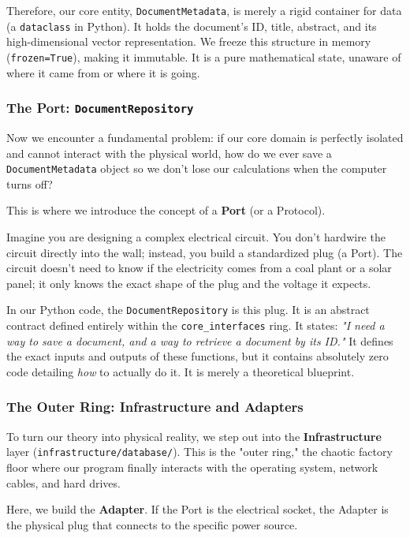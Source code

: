 Therefore, our core entity, \texttt{DocumentMetadata}, is merely a rigid container for data (a \texttt{dataclass} in Python). It holds the document's ID, title, abstract, and its high-dimensional vector representation. We freeze this structure in memory (\texttt{frozen=True}), making it immutable. It is a pure mathematical state, unaware of where it came from or where it is going.

\subsubsection*{The Port: \texttt{DocumentRepository}}

Now we encounter a fundamental problem: if our core domain is perfectly isolated and cannot interact with the physical world, how do we ever save a \texttt{DocumentMetadata} object so we don't lose our calculations when the computer turns off?

This is where we introduce the concept of a \textbf{Port} (or a Protocol).

Imagine you are designing a complex electrical circuit. You don't hardwire the circuit directly into the wall; instead, you build a standardized plug (a Port). The circuit doesn't need to know if the electricity comes from a coal plant or a solar panel; it only knows the exact shape of the plug and the voltage it expects.

In our Python code, the \texttt{DocumentRepository} is this plug. It is an abstract contract defined entirely within the \texttt{core\_interfaces} ring. It states: \textit{"I need a way to save a document, and a way to retrieve a document by its ID."} It defines the exact inputs and outputs of these functions, but it contains absolutely zero code detailing \textit{how} to actually do it. It is merely a theoretical blueprint.

\subsubsection*{The Outer Ring: Infrastructure and Adapters}

To turn our theory into physical reality, we step out into the \textbf{Infrastructure} layer (\texttt{infrastructure/database/}). This is the "outer ring," the chaotic factory floor where our program finally interacts with the operating system, network cables, and hard drives.

Here, we build the \textbf{Adapter}. If the Port is the electrical socket, the Adapter is the physical plug that connects to the specific power source.


